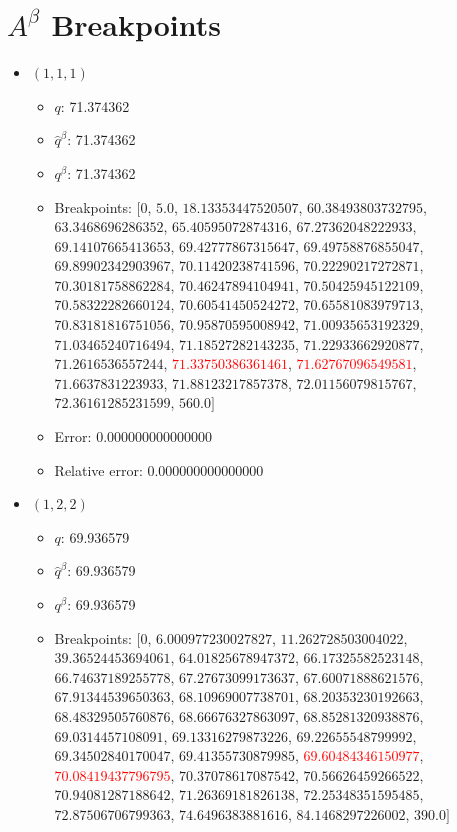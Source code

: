 \documentclass{article}%
\begin{document}
\section{$A^\beta$ Breakpoints}%
\thispagestyle{plain}%
\begin{itemize}%
	\item $(1, 1, 1)$%
	\begin{itemize}%
		\item $q$: 71.374362%
		\item $\hat{q}^\beta$: 71.374362%
		\item $q^\beta$: 71.374362%
		\item Breakpoints: $[$$0$, $5.0$, $18.13353447520507$, $60.38493803732795$, $63.3468696286352$, $65.40595072874316$, $67.27362048222933$, $69.14107665413653$, $69.42777867315647$, $69.49758876855047$, $69.89902342903967$, $70.11420238741596$, $70.22290217272871$, $70.30181758862284$, $70.46247894104941$, $70.50425945122109$, $70.58322282660124$, $70.60541450524272$, $70.65581083979713$, $70.83181816751056$, $70.95870595008942$, $71.00935653192329$, $71.03465240716494$, $71.18527282143235$, $71.22933662920877$, $71.2616536557244$, \textcolor{red}{$71.33750386361461$}, \textcolor{red}{$71.62767096549581$}, $71.6637831223933$, $71.88123217857378$, $72.01156079815767$, $72.36161285231599$, $560.0$$]$%
		\item Error: 0.000000000000000%
		\item Relative error: 0.000000000000000%
	\end{itemize}%
	\item $(1, 2, 2)$%
	\begin{itemize}%
		\item $q$: 69.936579%
		\item $\hat{q}^\beta$: 69.936579%
		\item $q^\beta$: 69.936579%
		\item Breakpoints: $[$$0$, $6.000977230027827$, $11.262728503004022$, $39.36524453694061$, $64.01825678947372$, $66.17325582523148$, $66.74637189255778$, $67.27673099173637$, $67.60071888621576$, $67.91344539650363$, $68.10969007738701$, $68.20353230192663$, $68.48329505760876$, $68.66676327863097$, $68.85281320938876$, $69.0314457108091$, $69.13316279873226$, $69.22655548799992$, $69.34502840170047$, $69.41355730879985$, \textcolor{red}{$69.60484346150977$}, \textcolor{red}{$70.08419437796795$}, $70.37078617087542$, $70.56626459266522$, $70.94081287188642$, $71.26369181826138$, $72.25348351595485$, $72.87506706799363$, $74.6496383881616$, $84.1468297226002$, $390.0$$]$%

\end{itemize}
\end{itemize}
\end{document}
